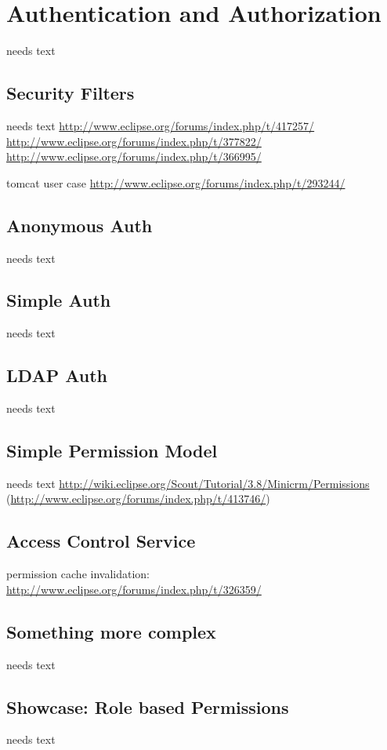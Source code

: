 \documentclass[a4paper,10pt,twoside]{book}
\begin{document}
\section{Authentication and Authorization}
needs text

\subsection{Security Filters}
needs text
\url{http://www.eclipse.org/forums/index.php/t/417257/}
\url{http://www.eclipse.org/forums/index.php/t/377822/}
\url{http://www.eclipse.org/forums/index.php/t/366995/}

tomcat user case \url{http://www.eclipse.org/forums/index.php/t/293244/}

\subsection{Anonymous Auth}
needs text

\subsection{Simple Auth}
needs text

\subsection{LDAP Auth}
needs text

\subsection{Simple Permission Model}
needs text
\url{http://wiki.eclipse.org/Scout/Tutorial/3.8/Minicrm/Permissions} (\url{http://www.eclipse.org/forums/index.php/t/413746/})

\subsection{Access Control Service}
permission cache invalidation: \url{http://www.eclipse.org/forums/index.php/t/326359/}

\subsection{Something more complex}
needs text

\subsection{Showcase: Role based Permissions}
needs text
\end{document}
